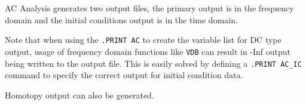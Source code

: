 

AC Analysis generates two output files, the primary output is in the
frequency domain and the initial conditions output is in the time domain.

Note that when using the \texttt{.PRINT AC} to create the variable list
for DC type output, usage of frequency domain functions like \texttt{VDB} can result
in -Inf output being written to the output file.  This is easily solved
by defining a \texttt{.PRINT AC\_IC} command to specify the correct
output for initial condition data.

Homotopy output can also be generated.

